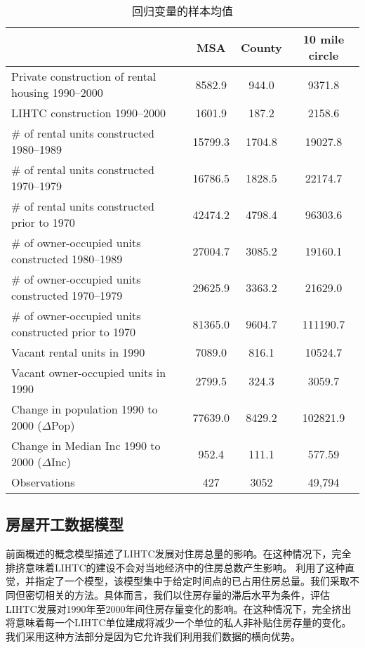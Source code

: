 \documentclass[lang=cn,11pt,a4paper]{paper}
\begin{document}
\begin{table}[h]
  \centering
  \setlength{\tabcolsep}{5mm}
    \caption{回归变量的样本均值}\label{tab3}
      \begin{tabular}{lccc}
        \toprule
        & \textbf{MSA} & \textbf{County} & \textbf{10 mile circle} \\
        \midrule
        Private construction of rental housing 1990--2000 & 8582.9 & 944.0 &
        9371.8 \\
        LIHTC construction 1990--2000 & 1601.9 & 187.2 & 2158.6 \\
        \# of rental units constructed 1980--1989 & 15799.3 & 1704.8 &
        19027.8 \\
        \# of rental units constructed 1970--1979 & 16786.5 & 1828.5 &
        22174.7 \\
        \# of rental units constructed prior to 1970 & 42474.2 & 4798.4 &
        96303.6 \\
        \# of owner-occupied units constructed 1980--1989 & 27004.7 & 3085.2 &
        19160.1 \\
        \# of owner-occupied units constructed 1970--1979 & 29625.9 & 3363.2 &
        21629.0 \\
        \# of owner-occupied units constructed prior to 1970 & 81365.0 & 9604.7
        & 111190.7 \\
        Vacant rental units in 1990 & 7089.0 & 816.1 & 10524.7 \\
        Vacant owner-occupied units in 1990 & 2799.5 & 324.3 &
        3059.7 \\
        Change in population 1990 to 2000 ($\Delta$Pop) & 77639.0 & 8429.2 &
        102821.9 \\
        Change in Median Inc 1990 to 2000 ($\Delta$Inc) & 952.4 & 111.1 &
        577.59 \\
        Observations & 427 & 3052 & 49,794 \\
        \bottomrule
      \end{tabular}
  \end{table}

\subsection{房屋开工数据模型}

前面概述的概念模型描述了LIHTC发展对住房总量的影响。在这种情况下，完全排挤意味着LIHTC的建设不会对当地经济中的住房总数产生影响。\cite{Sinai20052137} 利用了这种直觉，并指定了一个模型，该模型集中于给定时间点的已占用住房总量。我们采取不同但密切相关的方法。具体而言，我们以住房存量的滞后水平为条件，评估LIHTC发展对1990年至2000年间住房存量变化的影响。在这种情况下，完全挤出将意味着每一个LIHTC单位建成将减少一个单位的私人非补贴住房存量的变化。我们采用这种方法部分是因为它允许我们利用我们数据的横向优势。
\end{document}
